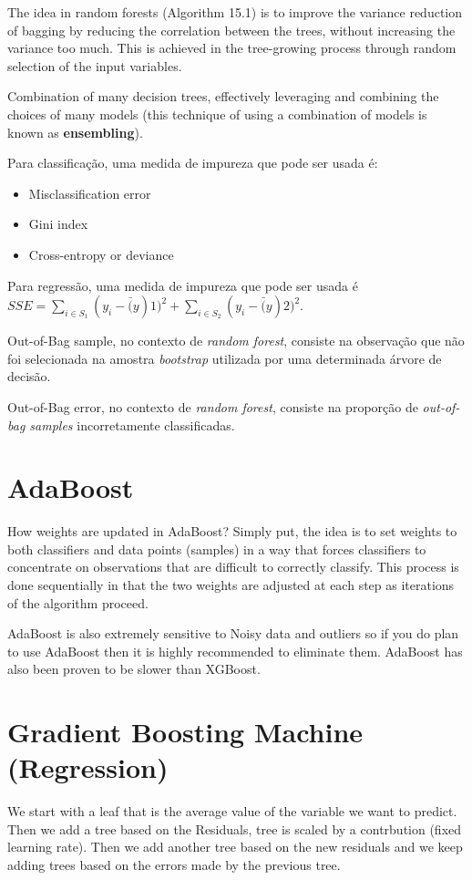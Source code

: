 The idea in random forests (Algorithm 15.1) is to improve
the variance reduction of bagging by reducing the correlation between the
trees, without increasing the variance too much. This is achieved in the
tree-growing process through random selection of the input variables.

Combination of many decision trees, effectively leveraging and combining the choices of many models (this technique of using a combination of models is known as \textbf{ensembling}).

Para classificação, uma medida de impureza que pode ser usada é:
\begin{itemize}
    \item Misclassification error
    \item Gini index
    \item Cross-entropy or deviance
    
\end{itemize}

Para regressão, uma medida de impureza que pode ser usada é  $SSE = \sum_{i \in S_1} (y_i - \bar(y)1)^2 + \sum_{i \in S_2} (y_i - \bar(y)2)^2$.

Out-of-Bag sample, no contexto de \textit{random forest}, consiste na observação que não foi selecionada na amostra \textit{bootstrap} utilizada por uma determinada árvore de decisão.

Out-of-Bag error, no contexto de \textit{random forest}, consiste na proporção de \textit{out-of-bag samples} incorretamente classificadas.

\section{AdaBoost}
How weights are updated in AdaBoost? Simply put, the idea is to set weights to both classifiers and data points (samples) in a way that forces classifiers to concentrate on observations that are difficult to correctly classify. This process is done sequentially in that the two weights are adjusted at each step as iterations of the algorithm proceed. 

AdaBoost is also extremely sensitive to Noisy data and outliers so if you do plan to use AdaBoost then it is highly recommended to eliminate them. AdaBoost has also been proven to be slower than XGBoost.

\section{Gradient Boosting Machine (Regression)}
We start with a leaf that is the average value of the variable we want to predict. Then we add a tree based on the Residuals, tree is scaled by a contrbution (fixed learning rate). Then we add another tree based on the new residuals and we keep adding trees based on the errors made by the previous tree.

